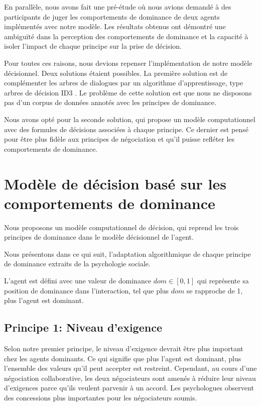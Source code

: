 		En parallèle, nous avons fait une pré-étude où nous avions demandé à des participants de juger les comportements de dominance de deux agents implémentés avec notre modèle. Les résultats obtenus ont démontré une ambiguïté dans la perception des comportements de dominance et la capacité à isoler l'impact de chaque principe sur la prise de décision.
		
		Pour toutes ces raisons, nous devions repenser l'implémentation de notre modèle décisionnel. Deux solutions étaient possibles. La première solution est de complémenter les arbres de dialogues par un algorithme d'apprentissage, type arbres de décision ID3 \cite{utgoff1989incremental}. Le problème de cette solution est que nous ne disposons pas d'un corpus de données annotés avec les principes de dominance. 
		
		Nous avons opté pour la seconde solution, qui propose un modèle computationnel avec des formules de décisions associées à chaque principe. 
		Ce dernier est pensé pour être plus fidèle aux principes de négociation et qu'il puisse refléter les comportements de dominance. 
	
	\section[Modèle de décision]{Modèle de décision basé sur les comportements de dominance}
	
	Nous proposons un modèle computationnel de décision, qui reprend les trois principes de dominance dans le modèle décisionnel de l'agent. 
	
	Nous présentons dans ce qui suit, l'adaptation algorithmique de chaque principe de dominance extraits de la psychologie sociale.
	
	L'agent est défini avec une valeur de dominance $dom \in [0,1]$ qui représente sa position de dominance dans l'interaction, tel que plus $dom$ se rapproche de 1, plus l'agent est dominant. 
	
	\subsection{Principe 1: Niveau d'exigence}
	\label{sec:concessions}
	Selon notre premier principe, le niveau d'exigence devrait être plus important chez les agents dominants. Ce qui signifie que plus l'agent est dominant, plus l'ensemble des valeurs qu'il peut accepter est restreint.
	Cependant, au cours d'une négociation collaborative, les deux négociateurs sont amenés à réduire leur niveau d'exigences parce qu'ils veulent parvenir à un accord. Les psychologues observent des concessions plus importantes pour les négociateurs soumis. 
	
